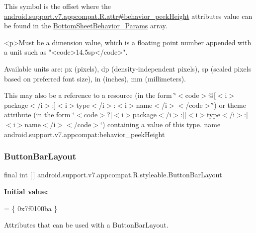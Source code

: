 This symbol is the offset where the \hyperlink{classandroid_1_1support_1_1v7_1_1appcompat_1_1R_1_1attr_a6efba039d772590549dfeaf0b0eeae12}{android.\+support.\+v7.\+appcompat.\+R.\+attr\#behavior\+\_\+peek\+Height} attribute\textquotesingle{}s value can be found in the \hyperlink{classandroid_1_1support_1_1v7_1_1appcompat_1_1R_1_1styleable_aed00e7319fe5debc6a1621afa2ca6bb5}{Bottom\+Sheet\+Behavior\+\_\+\+Params} array.

\begin{DoxyVerb}      <p>Must be a dimension value, which is a floating point number appended with a unit such as "<code>14.5sp</code>".
\end{DoxyVerb}
 Available units are\+: px (pixels), dp (density-\/independent pixels), sp (scaled pixels based on preferred font size), in (inches), mm (millimeters). 

This may also be a reference to a resource (in the form \char`\"{}$<$code$>$@\mbox{[}$<$i$>$package$<$/i$>$\+:\mbox{]}$<$i$>$type$<$/i$>$\+:$<$i$>$name$<$/i$>$$<$/code$>$\char`\"{}) or theme attribute (in the form \char`\"{}$<$code$>$?\mbox{[}$<$i$>$package$<$/i$>$\+:\mbox{]}\mbox{[}$<$i$>$type$<$/i$>$\+:\mbox{]}$<$i$>$name$<$/i$>$$<$/code$>$\char`\"{}) containing a value of this type.  name android.\+support.\+v7.\+appcompat\+:behavior\+\_\+peek\+Height \mbox{\label{classandroid_1_1support_1_1v7_1_1appcompat_1_1R_1_1styleable_a7c65a92be88c9f9803f46314aaabe499}} 
\subsubsection{\texorpdfstring{Button\+Bar\+Layout}{ButtonBarLayout}}
{\footnotesize\ttfamily final int \mbox{[}$\,$\mbox{]} android.\+support.\+v7.\+appcompat.\+R.\+styleable.\+Button\+Bar\+Layout\hspace{0.3cm}{\ttfamily [static]}}

{\bfseries Initial value\+:}
\begin{DoxyCode}
= \{
            0x7f0100ba
        \}
\end{DoxyCode}
Attributes that can be used with a Button\+Bar\+Layout. 

